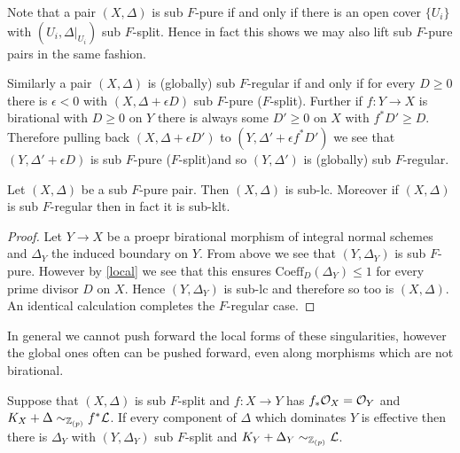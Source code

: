 Note that a pair $(X,\Delta)$ is sub $F$-pure if and only if there is an open cover $\{U_{i}\}$ with $(U_{i},\Delta|_{U_{i}})$ sub $F$-split. Hence in fact this shows we may also lift sub $F$-pure pairs in the same fashion. 

Similarly a pair $(X,\Delta)$ is (globally) sub $F$-regular if and only if for every $D \geq 0$ there is $\epsilon<0$ with $(X,\Delta+\epsilon D)$ sub $F$-pure ($F$-split). Further if $f\colon Y \to X$ is birational with $D \geq 0$ on $Y$ there is always some $D' \geq 0$ on $X$  with $f^{*}D' \geq D$. Therefore pulling back $(X,\Delta +\epsilon D')$ to $(Y,\Delta'+\epsilon f^{*}D')$ we see that  $(Y,\Delta'+\epsilon D)$ is sub $F$-pure ($F$-split)and so $(Y,\Delta')$ is (globally) sub $F$-regular.


\begin{theorem}
	
	Let $(X,\Delta)$ be a sub $F$-pure pair. Then $(X,\Delta)$ is sub-lc. Moreover if $(X,\Delta)$ is sub $F$-regular then in fact it is sub-klt.
	
\end{theorem}

\begin{proof}
		Let $Y \to X$ be a proepr birational morphism of integral normal schemes and $\Delta_{Y}$ the induced boundary on $Y$. From above we see that $(Y,\Delta_{Y})$ is sub $F$-pure. However by \autoref{local} we see that this ensures $\text{Coeff}_{D}(\Delta_{Y}) \leq 1$ for every prime divisor $D$ on $X$. Hence $(Y,\Delta_{Y})$ is sub-lc and therefore so too is $(X,\Delta)$. An identical calculation completes the $F$-regular case.
\end{proof}

In general we cannot push forward the local forms of these singularities, however the global ones often can be pushed forward, even along morphisms which are not birational. 

\begin{lemma}
	Suppose that $(X,\Delta)$ is sub $F$-split and $f\colon X \to Y$ has $f_{*}\mathcal{O}_{X} =\mathcal{O}_{Y}$ and $K_{X}+\Delta \sim_{\mathbb{Z}_{(p)}} f^{*}\mathcal{L}$. If every component of $\Delta$ which dominates $Y$ is effective then there is $\Delta_{Y}$ with $(Y,\Delta_{Y})$ sub $F$-split and $K_{Y}+\Delta_{Y} \sim_{\mathbb{Z}_{(p)}} \mathcal{L}$.
\end{lemma}

